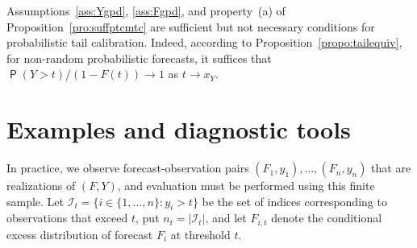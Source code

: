 \documentclass[12pt]{article}
\newcommand{\E}{\operatorname{\mathsf{E}}}
\newcommand{\Q}{\operatorname{\mathsf{P}}}
\newcommand{\R}{\mathbb{R}}
\newcommand{\Ii}{\mathcal{I}}
\newcommand{\Exp}{\operatorname{Exp}} %
\newcommand{\1}{\mathbf{1}} %
\def\jon#1{{\textcolor{red}{\bf $[$JK: #1$]$}}}
\newcommand{\js}[1]{\textcolor{darkteal}{\sffamily\small\upshape [JS: #1]}}
\theoremstyle{definition}
\newtheorem{remark}[propo]{Remark}
\begin{document}

Assumptions~\ref{ass:Ygpd}, \ref{ass:Fgpd}, and property~(a) of Proposition~\ref{pro:suffptcmtc} are sufficient but not necessary conditions for probabilistic tail calibration.
Indeed, according to Proposition~\ref{propo:tailequiv}, for non-random probabilistic forecasts, it suffices that $\Q(Y>t)/(1-F(t)) \to 1$ as $t \to x_Y$.

\section{Examples and diagnostic tools}\label{sec:diagnostics}

In practice, we observe forecast-observation pairs $(F_{1}, y_{1}), \dots, (F_{n}, y_{n})$ that are realizations of $(F, Y)$, and evaluation must be performed using this finite sample. Let $\Ii_{t} = \{ i \in \{ 1, \dots, n \} : y_{i} > t \}$ be the set of indices corresponding to observations that exceed $t$, put $n_{t} = |\Ii_{t}|$, and let $F_{i, t}$ denote the conditional excess distribution of forecast $F_{i}$ at threshold $t$.
\end{document}
